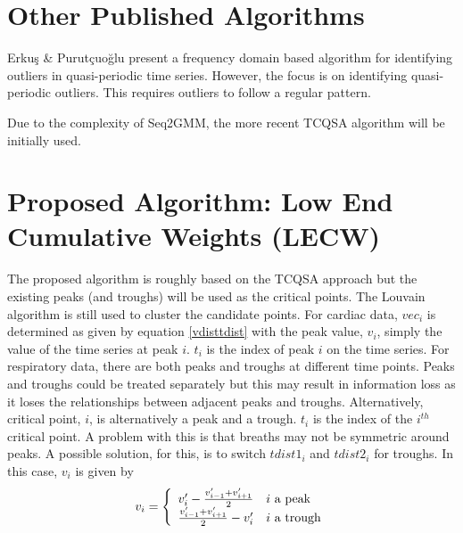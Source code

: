 \documentclass[twoside,twocolumn]{article}
\begin{document}
\section{Other Published Algorithms}

Erku\c{s} \& Purut\c{c}uo\u{g}lu\cite{Erkus2021} present a frequency domain based algorithm for identifying outliers in quasi-periodic time series.  However, the focus is on identifying quasi-periodic outliers.  This requires outliers to follow a regular pattern. 

Due to the complexity of Seq2GMM, the more recent TCQSA algorithm will be initially used.

\section{Proposed Algorithm: Low End Cumulative Weights (LECW)}

The proposed algorithm is roughly based on the TCQSA approach but the existing peaks (and troughs) will be used as the critical points.  The Louvain algorithm is still used to cluster the candidate points.  For cardiac data, $vec_i$ is determined as given by equation \ref{vdisttdist} with the peak value, $v_i$, simply the value of the time series at peak $i$.  $t_i$ is the index of peak $i$ on the time series.  For respiratory data, there are both peaks and troughs at different time points.  Peaks and troughs could be treated separately but this may result in information loss as it loses the relationships between adjacent peaks and troughs.  Alternatively, critical point, $i$, is alternatively a peak and a trough.  $t_i$ is the index of the $i^{th}$ critical point.  A problem with this is that breaths may not be symmetric around peaks.  A possible solution, for this, is to switch $tdist1_i$ and $tdist2_i$ for troughs.  In this case, $v_i$ is given by
\begin{eqnarray}
	v_i=\left\{ 
	\begin{array}{ c l }
		v_i^{\prime} - \frac{v_{i-1}^{\prime}+v_{i+1}^{\prime}}{2} & i \text{ a peak} \\
		\frac{v_{i-1}^{\prime}+v_{i+1}^{\prime}}{2} - v_i^{\prime} & i \text{ a trough}
	\end{array}
	\right.
	\label{respiratoryV}
\end{eqnarray}
\end{document}
